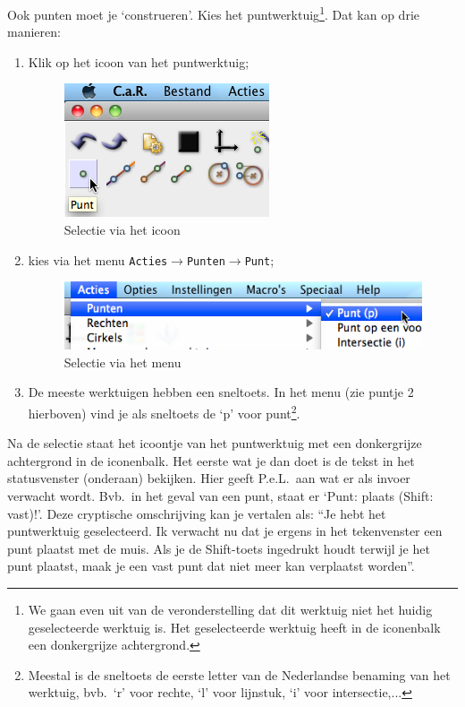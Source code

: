 Ook punten moet je `construeren'. Kies het puntwerktuig\footnote{We gaan even uit van de veronderstelling dat dit werktuig niet het huidig geselecteerde werktuig is. Het geselecteerde werktuig heeft in de iconenbalk een donkergrijze achtergrond.}. Dat kan op drie manieren:
\begin{enumerate}
\item Klik op het icoon van het puntwerktuig;
\begin{figure}[htb]
    \centering
    \includegraphics[]{figuren/PeL/Punticoon.png}
       \caption{Selectie via het icoon}
    \label{fig:punticoon}
\end{figure}
\item kies via het menu \texttt{Acties$\rightarrow$Punten$\rightarrow$Punt};
\begin{figure}[htb]
    \centering
    \includegraphics[scale=0.5]{figuren/PeL/Puntmenu.png}
       \caption{Selectie via het menu}
    \label{fig:puntmenu}
\end{figure}
\item De meeste werktuigen hebben een sneltoets. In het menu (zie puntje 2 hierboven) vind je als sneltoets de `p' voor punt\footnote{Meestal is de sneltoets de eerste letter van de Nederlandse benaming van het werktuig, bvb.\ `r' voor rechte, `l' voor lijnstuk, `i' voor intersectie,...}. 
\end{enumerate}
 
Na de selectie staat het icoontje van het puntwerktuig met een donkergrijze achtergrond in de iconenbalk. Het eerste wat je dan doet is de tekst in het statusvenster (onderaan) bekijken. Hier geeft P.e.L.\ aan wat er als invoer verwacht wordt. Bvb.\ in het geval van een punt, staat er `Punt: plaats (Shift: vast)!'. Deze cryptische omschrijving kan je vertalen als: ``Je hebt het puntwerktuig geselecteerd. Ik verwacht nu dat je ergens in het tekenvenster een punt plaatst met de muis. Als je de Shift-toets ingedrukt houdt terwijl je het punt plaatst, maak je een vast punt dat niet meer kan verplaatst worden''. 


